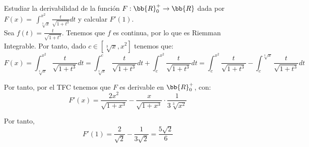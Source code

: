 \begin{ejercicio}
    Estudiar la derivabilidad de la función $F:\bb{R}^+_0 \to \bb{R}$ dada por $F(x)=~\int_{\sqrt[3]{x}}^{x^2} \frac{t}{\sqrt{1+t^3}} dt$ y calcular $F'(1)$.\\

    Sea $\displaystyle f(t)=\frac{t}{\sqrt{1+t^3}}$. Tenemos que $f$ es continua, por lo que es Riemman Integrable. Por tanto, dado $c\in [\sqrt[3]{x}, x^2]$ tenemos que:
    \begin{equation*}
        F(x)=\int_{\sqrt[3]{x}}^{x^2} \frac{t}{\sqrt{1+t^3}} dt
        = \int_{\sqrt[3]{x}}^{c} \frac{t}{\sqrt{1+t^3}} dt
        + \int_{c}^{x^2} \frac{t}{\sqrt{1+t^3}} dt
        = \int_{c}^{x^2} \frac{t}{\sqrt{1+t^3}}
        - \int_c^{\sqrt[3]{x}} \frac{t}{\sqrt{1+t^3}} dt
    \end{equation*}

    Por tanto, por el TFC tenemos que $F$ es derivable en $\bb{R}^+_0$, con:
    \begin{equation*}
        F'(x) = \frac{2x^2}{\sqrt{1+x^3}} - \frac{x}{\sqrt{1+x^3}}\cdot \frac{1}{3\sqrt[3]{x^2}}
    \end{equation*}

    Por tanto,
    \begin{equation*}
        F'(1) = \frac{2}{\sqrt{2}} - \frac{1}{3\sqrt{2}} = \frac{5\sqrt{2}}{6}
    \end{equation*}
\end{ejercicio}

